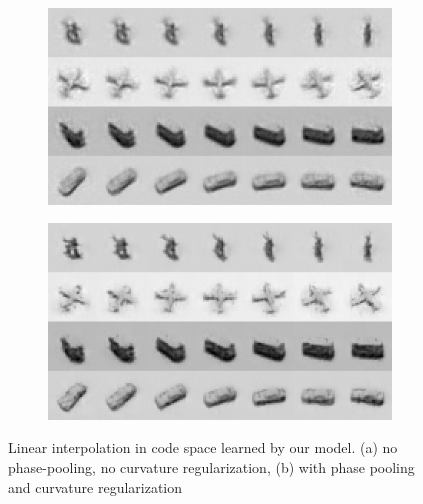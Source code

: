 \documentclass{article} %
\begin{document}
\begin{figure}
  \centering
  \begin{subfigure}[b]{0.45\textwidth}
        \includegraphics[width=\textwidth]{./figures/taco/interp_no_pool_no_reg.png}
        \caption{}
  \label{fig:noReg}
  \end{subfigure}
  \begin{subfigure}[b]{0.45\textwidth}
        \includegraphics[width=\textwidth]{./figures/taco/interp_pool_best_reg.png} 
        \caption{}
        \label{fig:withReg}
  \end{subfigure}
  \caption{Linear interpolation in code space learned by our model. (a) no phase-pooling, no curvature regularization, (b) with phase pooling and curvature regularization}
\end{figure}
\end{document}

